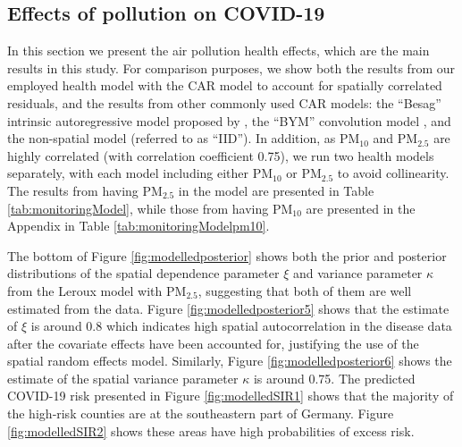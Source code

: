 \documentclass[12,]{article}
\begin{document}
\hypertarget{effects-of-pollution-on-covid-19}{%
\subsection{Effects of pollution on
COVID-19}\label{effects-of-pollution-on-covid-19}}

In this section we present the air pollution health effects, which are
the main results in this study. For comparison purposes, we show both
the results from our employed health model with the
\textcite{Leroux1999} CAR model to account for spatially correlated
residuals, and the results from other commonly used CAR models: the
``Besag'' intrinsic autoregressive model proposed by
\textcite{Besag1991}, the ``BYM'' convolution model \autocite[also
proposed by][]{Besag1991}, and the non-spatial model (referred to as
``IID''). In addition, as PM\(_{10}\) and PM\(_{2.5}\) are highly
correlated (with correlation coefficient 0.75), we run two health models
separately, with each model including either PM\(_{10}\) or PM\(_{2.5}\)
to avoid collinearity. The results from having PM\(_{2.5}\) in the model
are presented in Table \ref{tab:monitoringModel}, while those from
having PM\(_{10}\) are presented in the Appendix in Table
\ref{tab:monitoringModelpm10}.

The bottom of Figure \ref{fig:modelledposterior} shows both the prior
and posterior distributions of the spatial dependence parameter \(\xi\)
and variance parameter \(\kappa\) from the Leroux model with
PM\(_{2.5}\), suggesting that both of them are well estimated from the
data. Figure \ref{fig:modelledposterior5} shows that the estimate of
\(\xi\) is around 0.8 which indicates high spatial autocorrelation in
the disease data after the covariate effects have been accounted for,
justifying the use of the spatial random effects model. Similarly,
Figure \ref{fig:modelledposterior6} shows the estimate of the spatial
variance parameter \(\kappa\) is around 0.75. The predicted COVID-19
risk presented in Figure \ref{fig:modelledSIR1} shows that the majority
of the high‐risk counties are at the southeastern part of Germany.
Figure \ref{fig:modelledSIR2} shows these areas have high probabilities
of excess risk.
\end{document}
